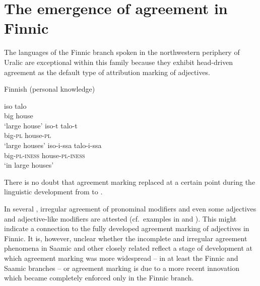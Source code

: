{\section[Agreement in Finnic]{The emergence of agreement in Finnic} \label{Finnic diachr}
The languages of the Finnic branch spoken in the northwestern periphery of Uralic are exceptional within this family because they exhibit head\hyp{}driven agreement as the default type of attribution marking of adjectives.
\begin{exe}
\ex \rm{Finnish (personal knowledge)}
\begin{xlist}
\ex
\gll	iso talo\\
	big house\\
\glt	‘large house’
\ex	
\gll	iso-t talo-t\\
	big-\textsc{pl} house-\textsc{pl}\\
\glt	‘large houses’
\ex	
\gll	iso-i-ssa	talo-i-ssa\\
	big-\textsc{pl}-\textsc{iness} house-\textsc{pl}-\textsc{iness}\\
\glt	‘in large houses’
\end{xlist}
\end{exe}
There is no doubt that agreement marking replaced  at a certain point during the linguistic development from  to .

In several , irregular agreement of pronominal modifiers and even some adjectives and adjective-like modifiers are attested (cf.~examples in \citealt{honti1997} and \citealt[288–295]{stolz2015a}). This might indicate a connection to the fully developed agreement marking of adjectives in Finnic. It is, however, unclear whether the incomplete and irregular agreement phenomena in Saamic and other closely related  reflect a stage of development at which agreement marking was more widespread – in at least the Finnic and Saamic branches – or agreement marking is due to a more recent innovation which became completely enforced only in the Finnic branch. 

}
